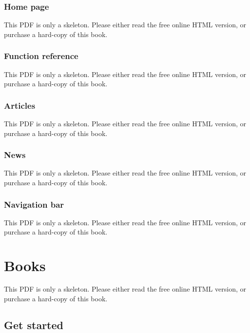 \documentclass[
  11pt,
]{krantz}
\theoremstyle{definition}
\theoremstyle{definition}
\theoremstyle{definition}
\theoremstyle{definition}
\theoremstyle{remark}
\begin{document}
\subsection{Home page}\label{home-page}

This PDF is only a skeleton. Please either read the free online HTML version, or purchase a hard-copy of this book.

\subsection{Function reference}\label{function-reference}

This PDF is only a skeleton. Please either read the free online HTML version, or purchase a hard-copy of this book.

\subsection{Articles}\label{articles}

This PDF is only a skeleton. Please either read the free online HTML version, or purchase a hard-copy of this book.

\subsection{News}\label{news}

This PDF is only a skeleton. Please either read the free online HTML version, or purchase a hard-copy of this book.

\subsection{Navigation bar}\label{navigation-bar-1}

This PDF is only a skeleton. Please either read the free online HTML version, or purchase a hard-copy of this book.

\chapter{Books}\label{books}

This PDF is only a skeleton. Please either read the free online HTML version, or purchase a hard-copy of this book.

\section{Get started}\label{bookdown-start}
\end{document}
